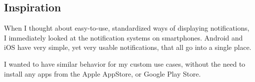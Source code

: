 \subsection{Inspiration}\label{sec:backgroud-inspiration}

When I thought about easy-to-use,
standardized ways of displaying notifications,
I immediately looked at
the notification systems on smartphones.
Android and iOS have very simple,
yet very usable notifications,
that all go into a single place.

I wanted to have similar behavior
for my custom use cases,
without the need to install any apps
from the Apple AppStore,
or Google Play Store.
